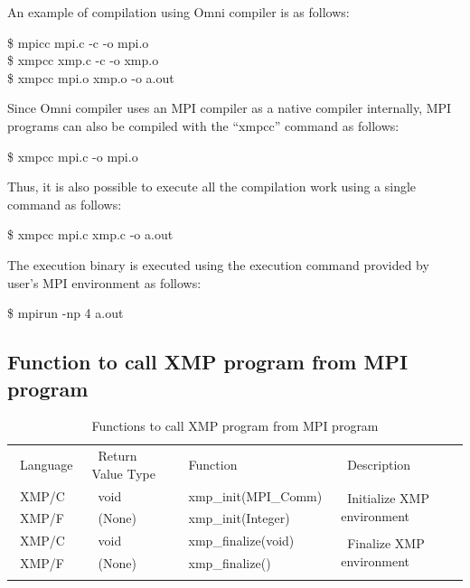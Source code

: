 \documentclass[graybox]{svmult}
\begin{document}
An example of compilation using Omni compiler is as follows:
\begin{svgraybox}
\$ mpicc mpi.c -c -o mpi.o\\
\$ xmpcc xmp.c -c -o xmp.o \\
\$ xmpcc mpi.o xmp.o -o a.out
\end{svgraybox}

Since Omni compiler uses an MPI compiler as a native compiler internally, MPI programs can also be compiled with the ``xmpcc'' command as follows:
\begin{svgraybox}
\$ xmpcc mpi.c -o mpi.o
\end{svgraybox}

Thus, it is also possible to execute all the compilation work using a single command as follows:
\begin{svgraybox}
\$ xmpcc mpi.c xmp.c -o a.out
\end{svgraybox}

The execution binary is executed using the execution command provided by user's MPI environment as follows:
\begin{svgraybox}
\$ mpirun -np 4 a.out
\end{svgraybox}

\subsection{Function to call XMP program from MPI program}
\begin{table}[h]
\centering
\caption{Functions to call XMP program from MPI program\cite{pgas-ei}} \label{tab:XMPfromMPI}
\begin{tabular}{l|l|l|l}
\hline\noalign{\smallskip}
~Language~  & ~Return Value Type~ & ~Function & ~Description \\ 
\noalign{\smallskip}\svhline\noalign{\smallskip}
~XMP/C      & ~void              & ~xmp\_init(MPI\_Comm)~ & \multirow{2}{*}{~Initialize XMP environment~}\\
~XMP/F       & ~(None)          & ~xmp\_init(Integer) & \\ 
\noalign{\smallskip}\hline\noalign{\smallskip}
~XMP/C      & ~void              & ~xmp\_finalize(void) & \multirow{2}{*}{~Finalize XMP environment~}\\
~XMP/F       & ~(None)          & ~xmp\_finalize() & \\ 
\noalign{\smallskip}\hline\noalign{\smallskip}
\end{tabular}
\end{table}
\end{document}
